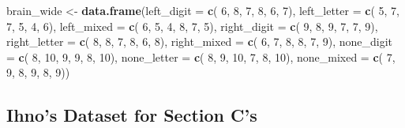 \documentclass[]{article}
\newenvironment{Shaded}{\begin{snugshade}}{\end{snugshade}}
\newcommand{\KeywordTok}[1]{\textcolor[rgb]{0.13,0.29,0.53}{\textbf{#1}}}
\newcommand{\DataTypeTok}[1]{\textcolor[rgb]{0.13,0.29,0.53}{#1}}
\newcommand{\DecValTok}[1]{\textcolor[rgb]{0.00,0.00,0.81}{#1}}
\newcommand{\StringTok}[1]{\textcolor[rgb]{0.31,0.60,0.02}{#1}}
\newcommand{\NormalTok}[1]{#1}
\begin{document}
\begin{Shaded}
\begin{Highlighting}[]
\NormalTok{brain_wide <-}\StringTok{ }\KeywordTok{data.frame}\NormalTok{(}\DataTypeTok{left_digit   =} \KeywordTok{c}\NormalTok{( }\DecValTok{6}\NormalTok{,  }\DecValTok{8}\NormalTok{,  }\DecValTok{7}\NormalTok{,  }\DecValTok{8}\NormalTok{,  }\DecValTok{6}\NormalTok{,  }\DecValTok{7}\NormalTok{),}
                         \DataTypeTok{left_letter  =} \KeywordTok{c}\NormalTok{( }\DecValTok{5}\NormalTok{,  }\DecValTok{7}\NormalTok{,  }\DecValTok{7}\NormalTok{,  }\DecValTok{5}\NormalTok{,  }\DecValTok{4}\NormalTok{,  }\DecValTok{6}\NormalTok{),}
                         \DataTypeTok{left_mixed   =} \KeywordTok{c}\NormalTok{( }\DecValTok{6}\NormalTok{,  }\DecValTok{5}\NormalTok{,  }\DecValTok{4}\NormalTok{,  }\DecValTok{8}\NormalTok{,  }\DecValTok{7}\NormalTok{,  }\DecValTok{5}\NormalTok{),}
                         \DataTypeTok{right_digit  =} \KeywordTok{c}\NormalTok{( }\DecValTok{9}\NormalTok{,  }\DecValTok{8}\NormalTok{,  }\DecValTok{9}\NormalTok{,  }\DecValTok{7}\NormalTok{,  }\DecValTok{7}\NormalTok{,  }\DecValTok{9}\NormalTok{),}
                         \DataTypeTok{right_letter =} \KeywordTok{c}\NormalTok{( }\DecValTok{8}\NormalTok{,  }\DecValTok{8}\NormalTok{,  }\DecValTok{7}\NormalTok{,  }\DecValTok{8}\NormalTok{,  }\DecValTok{6}\NormalTok{,  }\DecValTok{8}\NormalTok{),}
                         \DataTypeTok{right_mixed  =} \KeywordTok{c}\NormalTok{( }\DecValTok{6}\NormalTok{,  }\DecValTok{7}\NormalTok{,  }\DecValTok{8}\NormalTok{,  }\DecValTok{8}\NormalTok{,  }\DecValTok{7}\NormalTok{,  }\DecValTok{9}\NormalTok{),}
                         \DataTypeTok{none_digit   =} \KeywordTok{c}\NormalTok{( }\DecValTok{8}\NormalTok{, }\DecValTok{10}\NormalTok{,  }\DecValTok{9}\NormalTok{,  }\DecValTok{9}\NormalTok{,  }\DecValTok{8}\NormalTok{, }\DecValTok{10}\NormalTok{),}
                         \DataTypeTok{none_letter  =} \KeywordTok{c}\NormalTok{( }\DecValTok{8}\NormalTok{,  }\DecValTok{9}\NormalTok{, }\DecValTok{10}\NormalTok{,  }\DecValTok{7}\NormalTok{,  }\DecValTok{8}\NormalTok{, }\DecValTok{10}\NormalTok{),}
                         \DataTypeTok{none_mixed   =} \KeywordTok{c}\NormalTok{( }\DecValTok{7}\NormalTok{,  }\DecValTok{9}\NormalTok{,  }\DecValTok{8}\NormalTok{,  }\DecValTok{9}\NormalTok{,  }\DecValTok{8}\NormalTok{,  }\DecValTok{9}\NormalTok{))}
\end{Highlighting}
\end{Shaded}

\clearpage

\subsection{Ihno's Dataset for Section
C's}\label{ihnos-dataset-for-section-cs}
\end{document}
